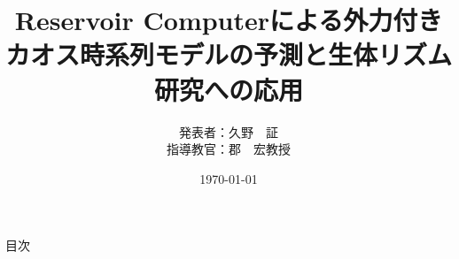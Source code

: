 \documentclass[aspectratio=169, 11pt]{beamer} %
\title[]{Reservoir Computerによる外力付きカオス時系列モデルの予測と生体リズム研究への応用}
\subtitle{}
\author[]{発表者：久野　証\\指導教官：郡　宏教授}
\institute[]{所属：東京大学工学部計数工学科数理情報工学コース 4年\\学籍番号：03-210599}
\date{\today}
\begin{document}
    \maketitle

    \begin{frame}{目次}
        \tableofcontents
    \end{frame}  

    
    
    
\end{document}

